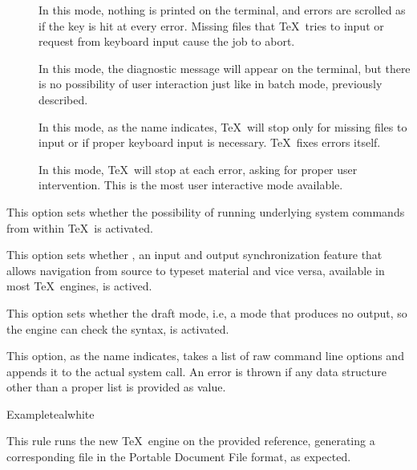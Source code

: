 \begin{description}
\begin{description}
\begin{description}
\item[] In this mode, nothing is printed on the terminal, and errors are scrolled as if the  key is hit at every error. Missing files that \TeX\ tries to input or request from keyboard input cause the job to abort.

\item[] In this mode, the diagnostic message will appear on the terminal, but there is no possibility of user interaction just like in batch mode, previously described.

\item[] In this mode, as the name indicates, \TeX\ will stop only for missing files to input or if proper keyboard input is necessary. \TeX\ fixes errors itself.

\item[] In this mode, \TeX\ will stop at each error, asking for proper user intervention. This is the most user interactive mode available.
\end{description}

\item[\rpsbox{shell}] This option sets whether the possibility of running underlying system commands from within \TeX\ is activated.

\item[\rpsbox{synctex}] This option sets whether , an input and output synchronization feature that allows navigation from source to typeset material and vice versa, available in most \TeX\ engines, is actived.

\item[\rpsbox{draft}] This option sets whether the draft mode, i.e, a mode that produces no output, so the engine can check the syntax, is activated.

\item[\abox{options}] This option, as the name indicates, takes a list of raw command line options and appends it to the actual system call. An error is thrown if any data structure other than a proper list is provided as value.
\end{description}

\begin{codebox}{Example}{teal}{\icnote}{white}
\end{codebox}

\item[\rulebox{lualatex}{Marco Daniel, Paulo Cereda}] This rule runs the new  \TeX\ engine on the provided  reference, generating a corresponding file in the Portable Document File format, as expected.


\end{description}
